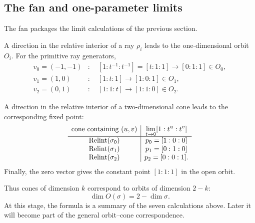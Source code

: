 \subsection{The fan and one-parameter limits}

The fan packages the limit calculations of the previous section.

A direction in the relative interior of a ray \(\rho_i\) leads to the
one-dimensional orbit \(O_i\). For the primitive ray generators,
\[
\begin{aligned}
v_0=(-1,-1)
&:\quad
[1:t^{-1}:t^{-1}]
=
[t:1:1]
\longrightarrow[0:1:1]\in O_0,
\\
v_1=(1,0)
&:\quad
[1:t:1]
\longrightarrow[1:0:1]\in O_1,
\\
v_2=(0,1)
&:\quad
[1:1:t]
\longrightarrow[1:1:0]\in O_2.
\end{aligned}
\]

A direction in the relative interior of a two-dimensional cone leads
to the corresponding fixed point:
\[
\begin{array}{c|c}
\text{cone containing }(u,v) & 
\displaystyle\lim_{t\to0}[1:t^u:t^v]\\
\hline
\operatorname{Relint}(\sigma_0) & p_0=[1:0:0]\\
\operatorname{Relint}(\sigma_1) & p_1=[0:1:0]\\
\operatorname{Relint}(\sigma_2) & p_2=[0:0:1].
\end{array}
\]
Finally, the zero vector gives the constant point \([1:1:1]\) in the
open orbit.

Thus cones of dimension \(k\) correspond to orbits of dimension
\(2-k\):
\[
\dim O(\sigma)=2-\dim\sigma.
\]
At this stage, the formula is a summary of the seven calculations
above. Later it will become part of the general orbit--cone
correspondence.

